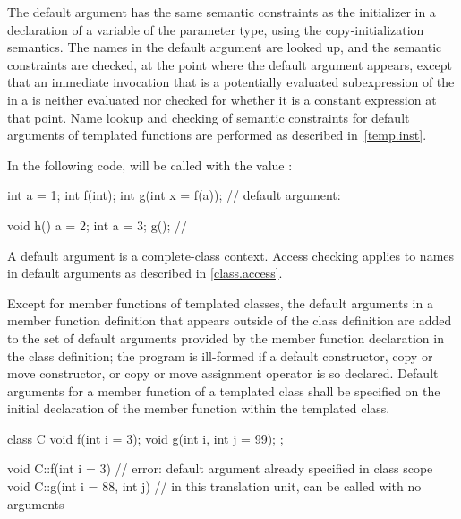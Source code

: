 \pnum
{}%
%
%
The default argument has the
same semantic constraints as the initializer in a
declaration of a variable of the parameter type, using the
copy-initialization semantics.
The names in the
default argument are looked up, and the semantic constraints are checked,
at the point where the default argument appears, except that
an immediate invocation that
is a potentially evaluated subexpression of
the  in a  is
neither evaluated
nor checked for whether it is a constant expression at that point.
Name lookup and checking of semantic constraints for default
arguments of templated functions are performed as described in~\ref{temp.inst}.
\begin{example}
In the following code,
%
will be called with the value
:

\begin{codeblock}
int a = 1;
int f(int);
int g(int x = f(a));            // default argument: 

void h() {
  a = 2;
  {
    int a = 3;
    g();                        // 
  }
}
\end{codeblock}
\end{example}
\begin{note}
A default argument is a complete-class context.
Access checking applies to names in default arguments as
described in \ref{class.access}.
\end{note}

\pnum
Except for member functions of templated classes, the
default arguments in a member function definition that appears
outside of the class definition
are added to the set of default arguments provided by the
member function declaration in the class definition;
the program is ill-formed if a default constructor,
copy or move constructor, or
copy or move assignment operator
is so declared.
Default arguments for a member function of a templated class
shall be specified on the initial declaration of the member
function within the templated class.
\begin{example}
\begin{codeblock}
class C {
  void f(int i = 3);
  void g(int i, int j = 99);
};

void C::f(int i = 3) {}         // error: default argument already specified in class scope
void C::g(int i = 88, int j) {} // in this translation unit,  can be called with no arguments
\end{codeblock}
\end{example}

